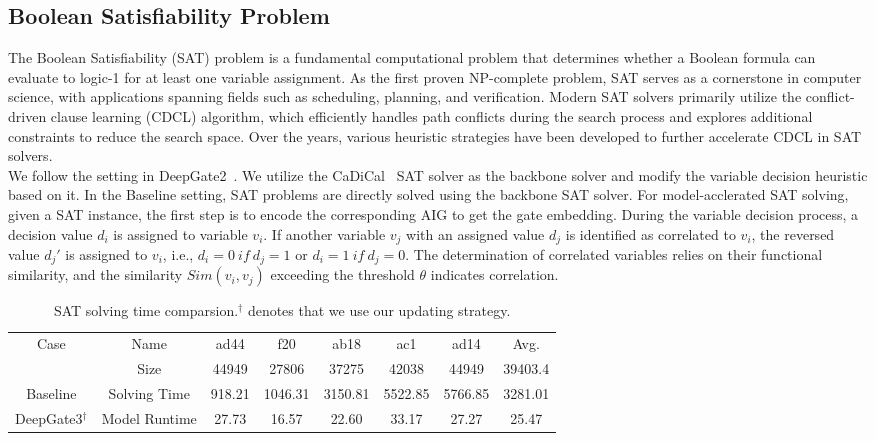 {\subsection{Boolean Satisfiability Problem}
The Boolean Satisfiability (SAT) problem is a fundamental computational problem that determines whether a Boolean formula can evaluate to logic-1 for at least one variable assignment. As the first proven NP-complete problem, SAT serves as a cornerstone in computer science, with applications spanning fields such as scheduling, planning, and verification. Modern SAT solvers primarily utilize the conflict-driven clause learning (CDCL) algorithm, which efficiently handles path conflicts during the search process and explores additional constraints to reduce the search space. Over the years, various heuristic strategies have been developed to further accelerate CDCL in SAT solvers.
\vspace{3pt} \\
We follow the setting in DeepGate2~\citep{shi2023deepgate2}. We utilize the CaDiCal~\citep{queue2019cadical} SAT solver as the backbone solver and modify the variable decision heuristic based on it. In the Baseline setting, SAT problems are directly solved using the backbone SAT solver. For model-acclerated SAT solving, given a SAT instance, the first step is to encode the corresponding AIG to get the gate embedding. During the variable decision process, a decision value $d_i$ is assigned to variable $v_i$. If another variable $v_j$ with an assigned value $d_j$ is identified as correlated to $v_i$, the reversed value $d_j'$ is assigned to $v_i$, i.e., $d_i = 0\ if\ d_j = 1$ or $d_i = 1\ if\ d_j = 0$. The determination of correlated variables relies on their functional similarity, and the similarity $Sim(v_i, v_j)$ exceeding the threshold $\theta$ indicates correlation.
\\
\begin{table}[]
\centering
\caption{SAT solving time comparsion.$^\dag$ denotes that we use our updating strategy.}
\label{tab:sat}
\begin{tabular}{@{}c|c|ccccc|c@{}}
\toprule
\multirow{2}{*}{Case} & Name & ad44 & f20 & ab18 & ac1 & ad14 & Avg. \\ \cmidrule(l){2-8} 
 & Size & 44949 & 27806 & 37275 & 42038 & 44949 & 39403.4 \\ \midrule
Baseline & Solving Time & 918.21 & 1046.31 & 3150.81 & 5522.85 & 5766.85 & 3281.01 \\ \midrule
\multirow{2}{*}{DeepGate3$^\dag$} & Model Runtime & 27.73 & 16.57 & 22.60 & 33.17 & 27.27 & 25.47 \\

\end{tabular}
\end{table}}

